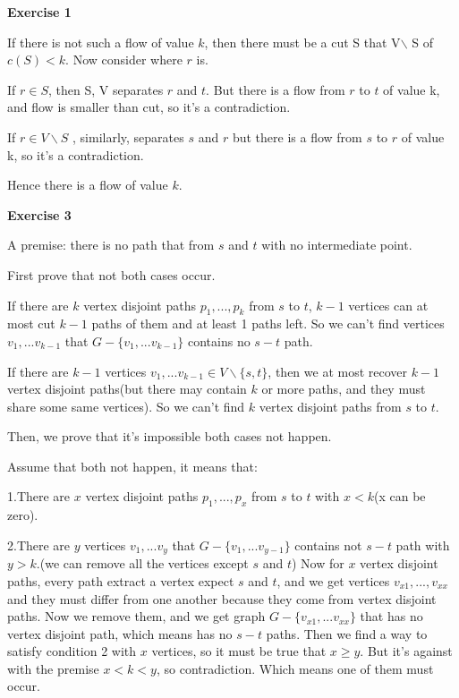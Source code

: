 \documentclass{article}
\title{Homework #5}
\author{Coffee Automaton}
\date{October 2019}
\begin{document}
\maketitle

\textbf{Exercise 1}

If there is not such a flow of value $k$, then there must be a cut S that V$\backslash$ S of $c(S) < k$. Now consider where $r$ is.

If $r \in S$, then S, V separates $r$ and $t$. But there is a flow from $r$ to $t$ of value k, and flow is smaller than cut, so it's a contradiction.

If $r \in V\backslash S$ , similarly, separates $s$ and $r$ but there is a flow from $s$ to $r$ of value k, so it's a contradiction.

Hence there is a flow of value $k$.



\textbf{Exercise 3}

A premise: there is no path that from $s$ and $t$ with no intermediate point.

First prove that not both cases occur.

If there are $k$ vertex disjoint paths $p_1 , ...,  p_k$ from $s$ to $t$, $k-1$ vertices can at most cut $k-1$ paths of them and at least 1 paths left. So we can't find vertices $v_1, ...v_{k-1}$ that $G - \{v_1, ...v_{k-1}\}$ contains no $s-t$ path.

If there are $k-1$ vertices $v_1, ...v_{k-1} \in V \backslash \{ s,t \}$, then we at most recover $k-1$ vertex disjoint paths(but there may contain $k$ or more paths, and they must share some same vertices). So we can't find $k$ vertex disjoint paths from $s$ to $t$.

Then, we prove that it's impossible both cases not happen.

Assume that both not happen, it means that:

1.There are $x$ vertex disjoint paths $p_1, ... , p_x$ from $s$ to $t$ with $x < k$(x can be zero).

2.There are $y$ vertices $v_1,... v_y$ that $G - \{v_1, ...v_{y-1}\}$ contains not $s-t$ path with $y > k$.(we can remove all the vertices except $s$ and $t$)
Now for $x$ vertex disjoint paths, every path extract a vertex expect $s$ and $t$, and we get vertices $v_{x1}, ... , v_{xx}$ and they must differ from one another because they come from vertex disjoint paths. Now we remove them, and we get graph $G - \{v_{x1}, ...v_{xx}\}$ that has no vertex disjoint path, which means has no $s-t$ paths. Then we find a way to satisfy condition 2 with $x$ vertices, so it must be true that $x \geqslant y$. But it's against with the premise $x < k < y$, so contradiction. Which means one of them must occur.
\end{document}
